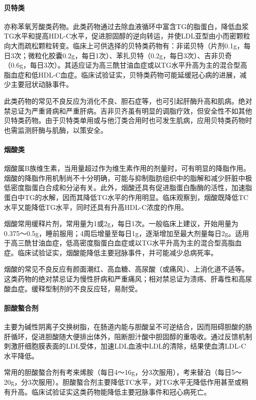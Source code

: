 \paragraph{贝特类}

亦称苯氧芳酸类药物。此类药物通过去除血液循环中富含TG的脂蛋白，降低血浆TG水平和提高HDL-C水平，促进胆固醇的逆向转运，并使LDL亚型由小而密颗粒向大而疏松颗粒转变。临床上可供选择的贝特类药物有：非诺贝特（片剂0.1g，每日3次；微粒化胶囊0.2g，每日1次）、苯扎贝特（0.2g，每日3次）、吉非贝奇（0.6g，每日3次）。其适应证为高三酰甘油血症或以TG水平升高为主的混合型高脂血症和低HDL-C血症。临床试验证实，贝特类药物可能延缓冠心病的进展，减少主要冠状动脉事件。

此类药物的常见不良反应为消化不良、胆石症等，也可引起肝酶升高和肌病。绝对禁忌证为严重肾病和严重肝病。吉非贝齐虽有明显的调脂疗效，但安全性不如其他贝特类药物。由于贝特类单用或与他汀类合用时也可发生肌病，应用贝特类药物时也需监测肝酶与肌酶，以策安全。
\paragraph{烟酸类}

烟酸属B族维生素，当用量超过作为维生素作用的剂量时，可有明显的降脂作用。烟酸的降脂作用机制尚不十分明确，可能与抑制脂肪组织中的脂解和减少肝脏中极低密度脂蛋白合成和分泌有关。此外，烟酸还具有促进脂蛋白酯酶的活性，加速脂蛋白中TG的水解，因而其降低TG水平的作用明显。临床观察到，烟酸既降低TC水平又能降低TG水平，同时还具有升高HDL-C浓度的作用。

烟酸常用缓释片剂，常用量为1或2g，每日1次。一般临床上建议，开始用量为0.375～0.5g，睡前服用；4周后增量至每日1g，逐渐增加至最大剂量每日2g。适用于高三酰甘油血症，低高密度脂蛋白血症或以TG水平升高为主的混合型高脂血症。临床试验证实，烟酸能降低主要冠脉事件，并可能减少总病死率。

烟酸的常见不良反应有颜面潮红、高血糖、高尿酸（或痛风）、上消化道不适等。这类药物的绝对禁忌证为慢性肝病和严重痛风；相对禁忌证为溃疡、肝毒性和高尿酸血症。缓释型制剂的不良反应轻，易耐受。
\paragraph{胆酸螯合剂}

主要为碱性阴离子交换树脂，在肠道内能与胆酸呈不可逆结合，因而阻碍胆酸的肠肝循环，促进胆酸随大便排出体外，阻断胆汁酸中胆固醇的重吸收。通过反馈机制刺激肝细胞膜表面的LDL受体，加速LDL血液中LDL的清除，结果使血清LDL-C水平降低。

常用的胆酸螯合剂有考来烯胺（每日4～16g，分3次服用），考来替泊（每日5～20g，分3次服用）。胆酸螯合剂主要降低TC水平，对TG水平无降低作用甚至或稍有升高。临床试验证实这类药物能降低主要冠脉事件和冠心病死亡。

